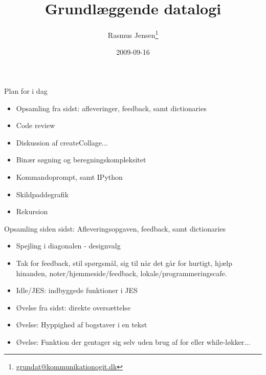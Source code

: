 \documentclass[a4paper,landscape]{slides}
\title{Grundlæggende datalogi}
\author{Rasmus Jensen\footnote{\url{grundat@kommunikationogit.dk}}}
\date{2009-09-16}
\begin{document}
\maketitle


\begin{slide}
	\begin{center} {\large 
            Plan for i dag
	} \end{center}
	\begin{itemize} \addtolength{\itemsep}{-\baselineskip}
		\item Opsamling fra sidst: afleveringer, feedback, samt dictionaries
                \item Code review
		\item Diskussion af createCollage...
                \item Binær søgning og beregningskompleksitet
		\item Kommandoprompt, samt IPython
		\item Skildpaddegrafik 
                \item Rekursion
	\end{itemize}
\end{slide}

\begin{slide}
	\begin{center} {\large 
            Opsamling siden sidst: Afleveringsopgaven, feedback, samt dictionaries
	} \end{center}
	\begin{itemize} \addtolength{\itemsep}{-\baselineskip}
                \item Spejling i diagonalen - designvalg
                \item Tak for feedback, stil spørgsmål, sig til når det går for hurtigt, hjælp hinanden, noter/hjemmeside/feedback, lokale/programmeringscafe.
                \item Idle/JES: indbyggede funktioner i JES
                \item Øvelse fra sidst: direkte oversættelse
                \item Øvelse: Hyppighed af bogstaver i en tekst
                \item Øvelse: Funktion der gentager sig selv uden brug af for eller while-løkker...
	\end{itemize}
\end{slide}
\end{document}
